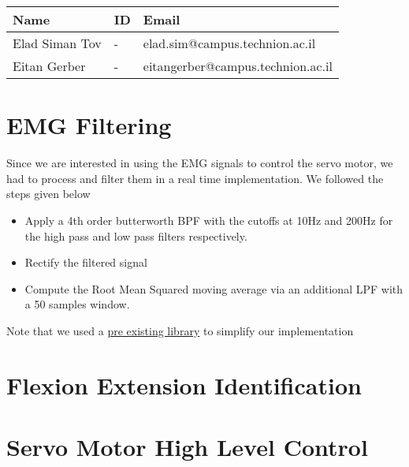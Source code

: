 \documentclass[10pt]{article}
\begin{document}
\begin{table}[h]
    \centering
    \begin{tabular}{l l l}
        \hline
        Name & ID & Email \\
        \hline
        Elad Siman Tov & - & elad.sim@campus.technion.ac.il \\
        \hline
        Eitan Gerber & - & eitangerber@campus.technion.ac.il \\
        \hline
    \end{tabular}
    \label{tab:personal_info}
\end{table}

\section{EMG Filtering}
Since we are interested in using the EMG signals to control the servo motor, we had to process and filter them in a real time implementation. We followed the steps given below
\begin{itemize}
    \item Apply a 4th order butterworth BPF with the cutoffs at 10Hz and 200Hz for the high pass and low pass filters respectively. 
    \item Rectify the filtered signal
    \item Compute the Root Mean Squared moving average via an additional LPF with a 50 samples window.
\end{itemize}
Note that we used a \href{https://github.com/tttapa/Arduino-Filters}{pre existing library} to simplify our implementation 
\section{Flexion Extension Identification}

\section{Servo Motor High Level Control}
\end{document}
